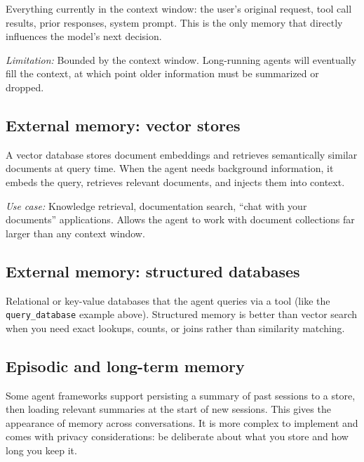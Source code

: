 Everything currently in the context window: the user's original request, tool call results, prior responses, system prompt. This is the only memory that directly influences the model's next decision.

\emph{Limitation:} Bounded by the context window. Long-running agents will eventually fill the context, at which point older information must be summarized or dropped.

\subsection{External memory: vector stores}

A vector database stores document embeddings and retrieves semantically similar documents at query time. When the agent needs background information, it embeds the query, retrieves relevant documents, and injects them into context.

\emph{Use case:} Knowledge retrieval, documentation search, ``chat with your documents'' applications. Allows the agent to work with document collections far larger than any context window.

\subsection{External memory: structured databases}

Relational or key-value databases that the agent queries via a tool (like the \texttt{query\_database} example above). Structured memory is better than vector search when you need exact lookups, counts, or joins rather than similarity matching.

\subsection{Episodic and long-term memory}

Some agent frameworks support persisting a summary of past sessions to a store, then loading relevant summaries at the start of new sessions. This gives the appearance of memory across conversations. It is more complex to implement and comes with privacy considerations: be deliberate about what you store and how long you keep it.


